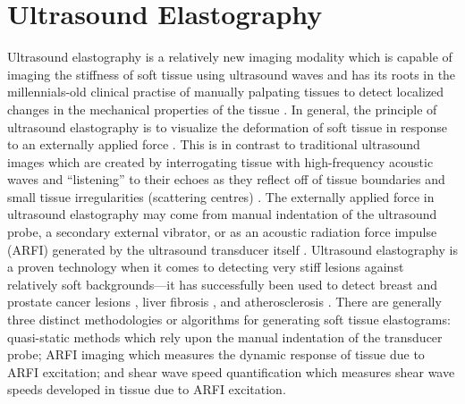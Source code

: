 	\section{Ultrasound Elastography}
		Ultrasound elastography is a relatively new imaging modality which is capable of imaging the stiffness of soft tissue using ultrasound waves \cite{greenleaf03} and has its roots in the millennials-old clinical practise of manually palpating tissues to detect localized changes in the mechanical properties of the tissue \cite{adams02}. In general, the principle of ultrasound elastography is to visualize the deformation of soft tissue in response to an externally applied force \cite{brusseau00}. This is in contrast to traditional ultrasound images which are created by interrogating tissue with high-frequency acoustic waves and ``listening'' to their echoes as they reflect off of tissue boundaries and small tissue irregularities (scattering centres) \cite{hoskins10}. The externally applied force in ultrasound elastography may come from manual indentation of the ultrasound probe, a secondary external vibrator, or as an acoustic radiation force impulse (ARFI) generated by the ultrasound transducer itself \cite{greenleaf03}. Ultrasound elastography is a proven technology when it comes to detecting very stiff lesions against relatively soft backgrounds---it has successfully been used to detect breast and prostate cancer lesions \cite{tanter08,konig05}, liver fibrosis \cite{sandrin03,karlas12}, and atherosclerosis \cite{maurice04}. There are generally three distinct methodologies or algorithms for generating soft tissue elastograms: quasi-static methods which rely upon the manual indentation of the transducer probe; ARFI imaging which measures the dynamic response of tissue due to ARFI excitation; and shear wave speed quantification which measures shear wave speeds developed in tissue due to ARFI excitation.


